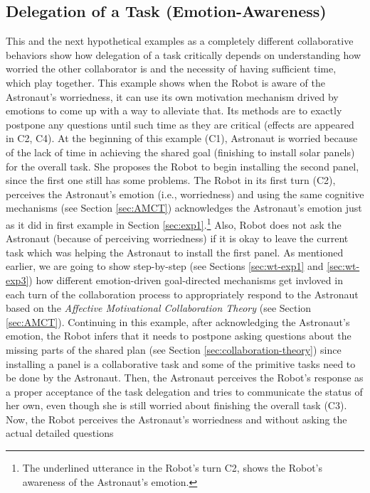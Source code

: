 \subsection{Delegation of a Task (Emotion-Awareness)}
\label{sec:exp3}

This and the next hypothetical examples as a completely different collaborative
behaviors show how delegation of a task critically depends on understanding how
worried the other collaborator is and the necessity of having sufficient time,
which play together. This example shows when the Robot is aware of the
Astronaut's worriedness, it can use its own motivation mechanism drived by
emotions to come up with a way to alleviate that. Its methods are to exactly
postpone any questions until such time as they are critical (effects are
appeared in C2, C4). At the beginning of this example (C1), Astronaut is worried
because of the lack of time in achieving the shared goal (finishing to install
solar panels) for the overall task. She proposes the Robot to begin installing
the second panel, since the first one still has some problems. The Robot in its
first turn (C2), perceives the Astronaut's emotion (i.e., worriedness) and using
the same cognitive mechanisms (see Section \ref{sec:AMCT}) acknowledges the
Astronaut's emotion just as it did in first example in Section
\ref{sec:exp1}.\footnote{The underlined utterance in the Robot's turn C2, shows
the Robot's awareness of the Astronaut's emotion.} Also, Robot does not ask the
Astronaut (because of perceiving worriedness) if it is okay to leave the current
task which was helping the Astronaut to install the first panel. As mentioned
earlier, we are going to show step-by-step (see Sections \ref{sec:wt-exp1} and
\ref{sec:wt-exp3}) how different emotion-driven goal-directed mechanisms get
invloved in each turn of the collaboration process to appropriately respond to
the Astronaut based on the \textit{Affective Motivational Collaboration Theory}
(see Section \ref{sec:AMCT}). Continuing in this example, after acknowledging
the Astronaut's emotion, the Robot infers that it needs to postpone asking
questions about the missing parts of the shared plan (see Section
\ref{sec:collaboration-theory}) since installing a panel is a collaborative task
and some of the primitive tasks need to be done by the Astronaut. Then, the
Astronaut perceives the Robot's response as a proper acceptance of the task
delegation and tries to communicate the status of her own, even though she is
still worried about finishing the overall task (C3). Now, the Robot perceives
the Astronaut's worriedness and without asking the actual detailed questions
